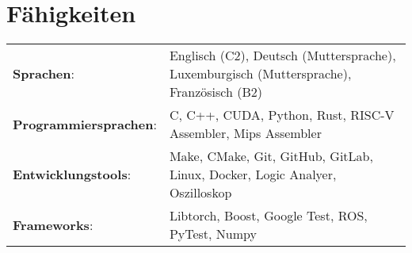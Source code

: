 \documentclass[a4paper,11pt]{article}
\begin{document}
\section{Fähigkeiten}
\footnotesize{
\begin{tabularx}{\linewidth}{@{}l X@{}}
    \textbf{Sprachen}: & { Englisch (C2), Deutsch (Muttersprache), Luxemburgisch (Muttersprache), Französisch (B2)} \\
    \textbf{Programmiersprachen}: & { C, C++, CUDA, Python, Rust, RISC-V Assembler, Mips Assembler} \\
    \textbf{Entwicklungstools}: & { Make, CMake, Git, GitHub, GitLab, Linux, Docker, Logic Analyer, Oszilloskop} \\
    \textbf{Frameworks}: & { Libtorch, Boost, Google Test, ROS, PyTest, Numpy} \\
\end{tabularx}
}
\end{document}
